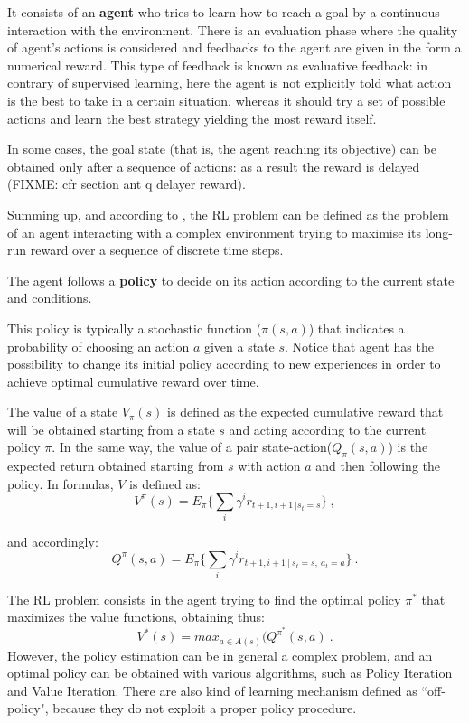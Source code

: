 \documentclass[10pt]{article}
\begin{document}
It consists of an  \textbf{agent}  who tries to learn how  to  reach  a  goal  by  a continuous interaction with  the environment. 
There is an evaluation phase where the quality of agent's actions is considered and feedbacks to the agent are given in the form a numerical reward. 
This type of feedback is known as evaluative feedback: in contrary of supervised learning, here the agent is not explicitly told what action is the best to take  in  a  certain  situation, whereas it should  try  a set of possible actions and learn the best strategy yielding the most reward itself.  

In some cases, the goal state (that is, the agent reaching its objective) can be obtained only after a sequence of actions: as a result the reward is delayed (FIXME: cfr section ant q delayer reward). 

Summing up, and according to \cite{diciotto}, the  RL  problem  can  be  defined  as  the  problem  of  an agent  interacting  with  a  complex environment trying to maximise its long-run reward over a sequence of discrete time steps.

The agent follows a \textbf{policy} to decide on its action according to the current state and conditions. 

This policy is typically a  stochastic  function ($\pi(s,a)$) that  indicates a probability  of  choosing an action $a$ given a state $s$.
Notice that agent has the possibility to change its initial policy  according  to  new experiences  in order to  achieve  optimal cumulative  reward  over  time.  

The  value  of  a  state $V_\pi(s)$  is  defined  as  the  expected  cumulative reward that  will  be  obtained starting from a state $s$ and acting according to the current policy $\pi$. 
In the same way, the value of  a pair state-action($Q_\pi(s,a)$) is  the  expected  return  obtained starting  from  $s$  with  action $a$  and  then following  the policy. 
In formulas, $V$ is defined as:
\begin{equation}
V^\pi(s)=E_\pi \{ \sum_i \gamma^i r_{t+1, i+1 ~ | s_t=s } \}~,
\end{equation}

and accordingly:
\begin{equation}
Q^\pi(s,a)=E_\pi \{ \sum_i \gamma^i r_{t+1, i+1 ~|~ s_t=s,~ a_t=a } \}~.
\end{equation}

The RL problem consists in the agent trying to find the optimal policy $\pi^*$ that maximizes the value  functions, obtaining thus:
\begin{equation}
V^*(s)= max_{a \in A(s)}(Q^{\pi^*}(s,a)~.
\end{equation} 
However, the policy estimation can be in general a complex problem, and an optimal policy can be obtained with various algorithms, such as Policy Iteration and Value Iteration. There are also kind of learning mechanism defined as ``off-policy", because they do not exploit a proper policy procedure.
\end{document}
